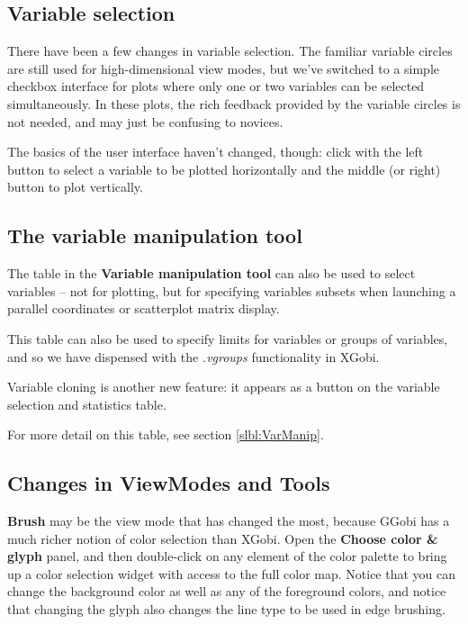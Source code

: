 \documentclass[11pt]{article}
\begin{document}
\subsection {Variable selection}

There have been a few changes in variable selection.  The familiar
variable circles are still used for high-dimensional view modes, but
we've switched to a simple checkbox interface for plots where only one
or two variables can be selected simultaneously.  In these plots, the
rich feedback provided by the variable circles is not needed, and may
just be confusing to novices.

The basics of the user interface haven't changed, though:
click with the left button to select a variable to be plotted
horizontally and the middle (or right) button to plot vertically.

\subsection {The variable manipulation tool}

The table in the {\bf Variable manipulation tool} can also be used to
select variables -- not for plotting, but for specifying variables
subsets when launching a parallel coordinates or scatterplot matrix display.

This table can also be used to specify limits for variables or groups
of variables, and so we have dispensed with the {\em .vgroups}
functionality in XGobi.

Variable cloning is another new feature: it appears as a button
on the variable selection and statistics table.

For more detail on this table, see section \ref{slbl:VarManip}.

\subsection{Changes in ViewModes and Tools}

{\bf Brush} may be the view mode that has changed the most,
because GGobi has a much richer notion of color selection than
XGobi.  Open the {\bf Choose color \& glyph} panel, and then
double-click on any element of the color palette to bring up a color
selection widget with access to the full color map.  Notice that you
can change the background color as well as any of the foreground
colors, and notice that changing the glyph also changes the line
type to be used in edge brushing.
\end{document}
